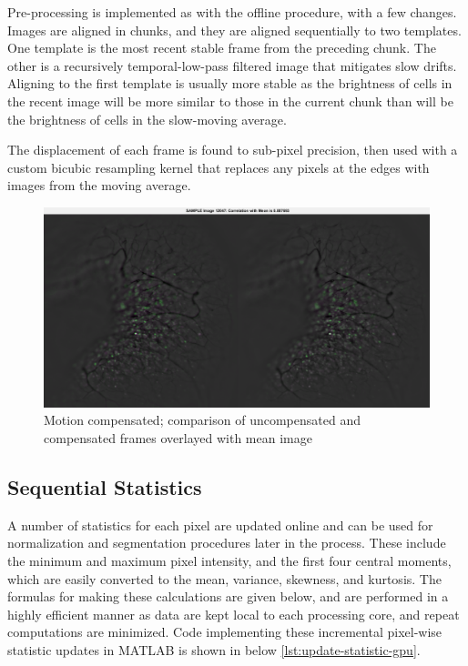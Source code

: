 Pre-processing is implemented as with the offline procedure, with a few changes.
Images are aligned in chunks, and they are aligned sequentially to two templates.
One template is the most recent stable frame from the preceding chunk.
The other is a recursively temporal-low-pass filtered image that mitigates slow drifts.
Aligning to the first template is usually more stable as the brightness of cells in the recent image will be more similar to those in the current chunk than will be the brightness of cells in the slow-moving average.

The displacement of each frame is found to sub-pixel precision, then used with a custom bicubic resampling kernel that replaces any pixels at the edges with images from the moving average.

\begin{figure}[htb]\centering
	\includegraphics[width=12cm]{figures/motion_correction_sample.png}
	\caption{Motion compensated; comparison of uncompensated and compensated frames overlayed with mean image}
\end{figure}

\subsection{Sequential Statistics}\label{sec:sequential-statistics}

A number of statistics for each pixel are updated online and can be used for normalization and segmentation procedures later in the process.
These include the minimum and maximum pixel intensity, and the first four central moments, which are easily converted to the mean, variance, skewness, and kurtosis.
The formulas for making these calculations are given below, and are performed in a highly efficient manner as data are kept local to each processing core, and repeat computations are minimized.
Code implementing these incremental pixel-wise statistic updates in MATLAB is shown in below \ref{lst:update-statistic-gpu}.

